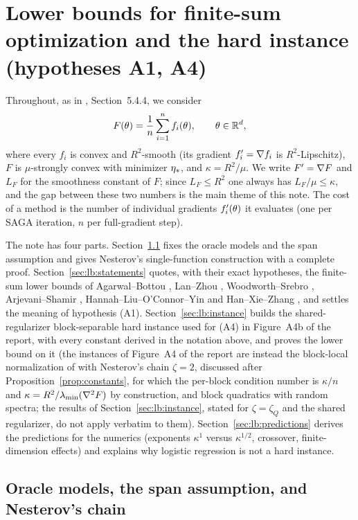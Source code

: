 \section{Lower bounds for finite-sum optimization and the hard instance (hypotheses A1, A4)}
\label{sec:lower_bound}

Throughout, as in \cite{bach2024learning}, Section~5.4.4, we consider
\[
F(\theta)=\frac1n\sum_{i=1}^n f_i(\theta),\qquad \theta\in\mathbb{R}^d,
\]
where every $f_i$ is convex and $R^2$-smooth (its gradient $f'_i=\nabla f_i$ is $R^2$-Lipschitz), $F$ is $\mu$-strongly convex with minimizer $\eta_\ast$, and $\kappa=R^2/\mu$. We write $F'=\nabla F$ and $L_F$ for the smoothness constant of $F$; since $L_F\le R^2$ one always has $L_F/\mu\le\kappa$, and the gap between these two numbers is the main theme of this note. The cost of a method is the number of individual gradients $f'_i(\theta)$ it evaluates (one per SAGA iteration, $n$ per full-gradient step).

The note has four parts. Section~\ref{sec:lb:oracle} fixes the oracle models and the span assumption and gives Nesterov's single-function construction with a complete proof. Section~\ref{sec:lb:statements} quotes, with their exact hypotheses, the finite-sum lower bounds of Agarwal--Bottou \cite{agarwal2015lower}, Lan--Zhou \cite{lan2018optimal}, Woodworth--Srebro \cite{woodworth2016tight}, Arjevani--Shamir \cite{arjevani2016dimension}, Hannah--Liu--O'Connor--Yin \cite{hannah2018breaking} and Han--Xie--Zhang \cite{han2024lower}, and settles the meaning of hypothesis (A1). Section~\ref{sec:lb:instance} builds the shared-regularizer block-separable hard instance used for (A4) in Figure~A4b of the report, with every constant derived in the notation above, and proves the lower bound on it (the instances of Figure~A4 of the report are instead the block-local normalization of \cite{lan2018optimal} with Nesterov's chain $\zeta=2$, discussed after Proposition~\ref{prop:constants}, for which the per-block condition number is $\kappa/n$ and $\kappa=R^2/\lambda_{\min}(\nabla^2F)$ by construction, and block quadratics with random spectra; the results of Section~\ref{sec:lb:instance}, stated for $\zeta=\zeta_Q$ and the shared regularizer, do not apply verbatim to them). Section~\ref{sec:lb:predictions} derives the predictions for the numerics (exponents $\kappa^1$ versus $\kappa^{1/2}$, crossover, finite-dimension effects) and explains why logistic regression is not a hard instance.

\subsection{Oracle models, the span assumption, and Nesterov's chain}
\label{sec:lb:oracle}

